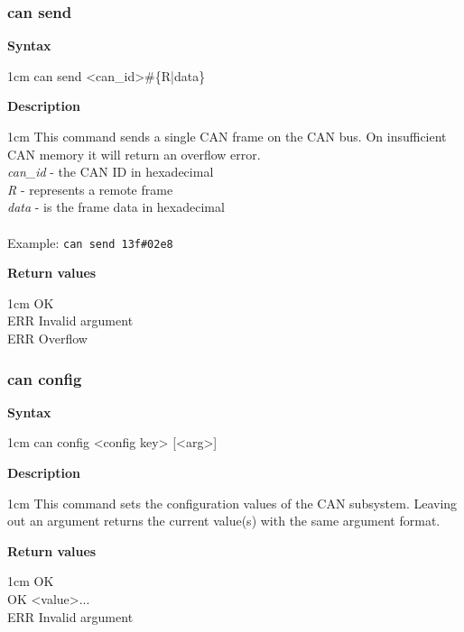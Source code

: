 \documentclass{article}[a4paper]
\begin{document}
\subsubsection{can send}
\begin{tcolorbox}
	{\bf Syntax}

	 1cm \dimexpr\linewidth-2cm\relax
	can send <can\_id>\#\{R|data\}

	\medskip
	{\bf Description}

	 1cm \dimexpr\linewidth-2cm\relax
	This command sends a single CAN frame on the CAN bus. On insufficient CAN
	memory it will return an overflow error.
	\medskip \\
	{\it can\_id} - the CAN ID in hexadecimal \\
	{\it R} - represents a remote frame \\
	{\it data} - is the frame data in hexadecimal \\
	\medskip \\
	Example: \texttt{can send 13f\#02e8}

	\medskip
	{\bf Return values}

	 1cm \dimexpr\linewidth-2cm\relax
	OK \\
	ERR Invalid argument \\
	ERR Overflow
\end{tcolorbox}

\subsubsection{can config}
\begin{tcolorbox}
	{\bf Syntax}

	 1cm \dimexpr\linewidth-2cm\relax
	can config <config key> [<arg>]

	\medskip
	{\bf Description}

	 1cm \dimexpr\linewidth-2cm\relax
	This command sets the configuration values of the CAN subsystem.
	Leaving out an argument returns the current value(s) with the same argument
	format.

	\medskip
	{\bf Return values}

	 1cm \dimexpr\linewidth-2cm\relax
	OK \\
	OK <value>... \\
	ERR Invalid argument
\end{tcolorbox}
\end{document}

